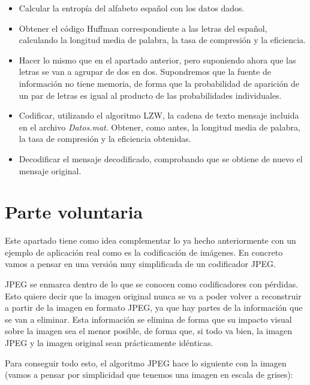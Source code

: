 \documentclass[es,practica]{uah}
\begin{document}
\begin{enumerate}
\begin{itemize}
	\item Calcular la entropía del alfabeto español con los datos dados.
	\item Obtener el código Huffman correspondiente a las letras del español, calculando la longitud media de palabra, la tasa de compresión y la eficiencia.
	\item Hacer lo mismo que en el apartado anterior, pero suponiendo ahora que las letras se van a agrupar de dos en dos. Supondremos que la fuente de información no tiene memoria, de forma que la probabilidad de aparición de un par de letras es igual al producto de las probabilidades individuales.
	\item Codificar, utilizando el algoritmo LZW, la cadena de texto mensaje incluida en el archivo \emph{Datos.mat}. Obtener, como antes, la longitud media de palabra, la tasa de compresión y la eficiencia obtenidas.
	\item Decodificar el mensaje decodificado, comprobando que se obtiene de nuevo el mensaje original.
\end{itemize}


\section{Parte voluntaria}

Este apartado tiene como idea complementar lo ya hecho anteriormente con un ejemplo de aplicación real como es la codificación de imágenes. En concreto vamos a pensar en una versión muy simplificada de un codificador JPEG. 

JPEG se enmarca dentro de lo que se conocen como codificadores con pérdidas. Esto quiere decir que la imagen original nunca se va a poder volver a reconstruir a partir de la imagen en formato JPEG, ya que hay partes de la información que se van a eliminar. Esta información se elimina de forma que su impacto visual sobre la imagen sea el menor posible, de forma que, si todo va bien, la imagen JPEG y la imagen original sean prácticamente idénticas. 

Para conseguir todo esto, el algoritmo JPEG hace lo siguiente con la imagen (vamos a pensar por simplicidad que tenemos una imagen en escala de grises):


\end{enumerate}
\end{document}
